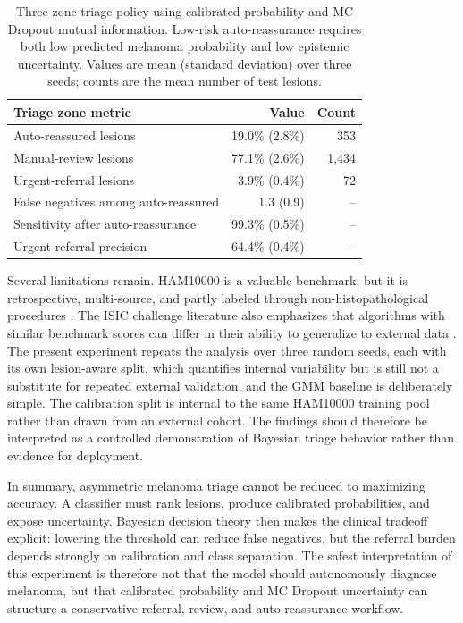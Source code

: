 \documentclass[11pt,a4paper]{article}
\begin{document}
\begin{table}[htbp]
\centering
\caption{Three-zone triage policy using calibrated probability and MC Dropout mutual information. Low-risk auto-reassurance requires both low predicted melanoma probability and low epistemic uncertainty. Values are mean (standard deviation) over three seeds; counts are the mean number of test lesions.}
\label{tab:triage-zone}
\begin{tabular}{lrr}
\toprule
Triage zone metric & Value & Count \\
\midrule
Auto-reassured lesions & 19.0\% (2.8\%) & 353 \\
Manual-review lesions & 77.1\% (2.6\%) & 1,434 \\
Urgent-referral lesions & 3.9\% (0.4\%) & 72 \\
False negatives among auto-reassured & 1.3 (0.9) & -- \\
Sensitivity after auto-reassurance & 99.3\% (0.5\%) & -- \\
Urgent-referral precision & 64.4\% (0.4\%) & -- \\
\bottomrule
\end{tabular}
\end{table}


Several limitations remain. HAM10000 is a valuable benchmark, but it is retrospective, multi-source, and partly labeled through non-histopathological procedures \citep{tschandl2018ham10000}. The ISIC challenge literature also emphasizes that algorithms with similar benchmark scores can differ in their ability to generalize to external data \citep{codella2018skin}. The present experiment repeats the analysis over three random seeds, each with its own lesion-aware split, which quantifies internal variability but is still not a substitute for repeated external validation, and the GMM baseline is deliberately simple. The calibration split is internal to the same HAM10000 training pool rather than drawn from an external cohort. The findings should therefore be interpreted as a controlled demonstration of Bayesian triage behavior rather than evidence for deployment.

In summary, asymmetric melanoma triage cannot be reduced to maximizing accuracy. A classifier must rank lesions, produce calibrated probabilities, and expose uncertainty. Bayesian decision theory then makes the clinical tradeoff explicit: lowering the threshold can reduce false negatives, but the referral burden depends strongly on calibration and class separation. The safest interpretation of this experiment is therefore not that the model should autonomously diagnose melanoma, but that calibrated probability and MC Dropout uncertainty can structure a conservative referral, review, and auto-reassurance workflow.
\end{document}
